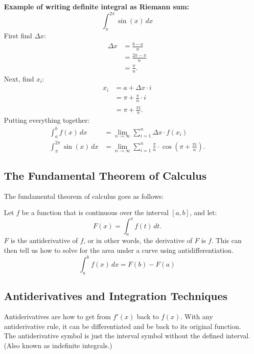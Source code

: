 \documentclass[12pt]{article}
\begin{document}
            \textbf{Example of writing definite integral as Riemann sum:}
            \[ \int_{\pi}^{2 \pi} \sin(x) \, dx \]
            First find $\Delta x$:
            \begin{align*}
                \Delta x &= \frac{b-a}{n} \\[6pt]
                &= \frac{2 \pi - \pi}{n} \\[6pt]
                &= \frac{\pi}{n}.
            \end{align*}
            Next, find $x_i$:
            \begin{align*}
                x_i &= a + \Delta x \cdot i \\
                &= \pi + \frac{\pi}{n} \cdot i \\[6pt]
                &= \pi + \frac{\pi i}{n}.
            \end{align*}
            Putting everything together:
            \begin{align*}
                \int_{a}^{b} f(x) \, dx &= \lim_{n \to \infty} \sum_{i=1}^{n} \Delta x \cdot f(x_i) \\[6pt]
                \int_{\pi}^{2 \pi} \sin(x) \, dx &= \lim_{n \to \infty} \sum_{i=1}^{n} \frac{\pi}{n} \cdot \cos{\left( \pi + \frac{\pi i}{n} \right)}.
            \end{align*}

        \subsection{The Fundamental Theorem of Calculus}
            \noindent The fundamental theorem of calculus goes as follows:

            \noindent Let $f$ be a function that is continuous over the interval $[a, b]$, and let:
            \[ F(x) = \int_{a}^{x} f(t) \, dt. \]
            $F$ is the antiderivative of $f$, or in other words, the derivative of $F$ is $f$. This can then tell us how to solve for the area under a curve using antidifferentiation.
            \[ \int_{a}^{b} f(x) \, dx = F(b) - F(a) \]

        \subsection{Antiderivatives and Integration Techniques}
            Antiderivatives are how to get from $f'(x)$ back to $f(x)$. With any antiderivative rule, it can be differentiated and be back to its original function. The antiderivative symbol is just the interval symbol without the defined interval. (Also known as indefinite integrals.)
\end{document}
